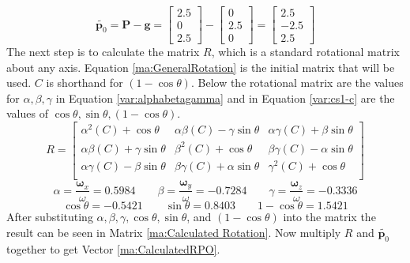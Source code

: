 \begin{equation}\label{Eq:po}
	\tilde{\mathbf{p}_{0}} = \mathbf{P} - \mathbf{g} = 
	\begin{bmatrix}
		2.5 \\
		0 	 \\
		2.5 
	\end{bmatrix} -
	\begin{bmatrix}
		0 \\
	 	2.5 	 \\
		0 
	\end{bmatrix} =
	\begin{bmatrix}
		 2.5 \\
		-2.5 	 \\
		 2.5 
	\end{bmatrix}
\end{equation}
The next step is to calculate the matrix $R$, which is a standard rotational matrix about any axis.
Equation \ref{ma:GeneralRotation} is the initial matrix that will be used. $C$ is shorthand for $(1-\cos\theta)$.
Below the rotational matrix are the values for $\alpha, \beta, \gamma$ in Equation \ref{var:alphabetagamma} and in Equation \ref{var:cs1-c} are the values of $\cos\theta, \sin\theta, (1-\cos\theta)$.
\begin{equation}\label{ma:GeneralRotation}
	R = 
	\begin{bmatrix}
		{\alpha}^{2}(C) + \cos\theta & 
		\alpha\beta(C) - \gamma\sin\theta & 
		\alpha\gamma(C) + \beta\sin\theta \\
		
		\alpha\beta(C) + \gamma\sin\theta & 
		{\beta}^{2}(C) + \cos\theta & 
		\beta\gamma(C) - \alpha\sin\theta \\
		
		\alpha\gamma(C) - \beta\sin\theta & 
		\beta\gamma(C) + \alpha\sin\theta & 
		{\gamma}^{2}(C) + \cos\theta \\
	\end{bmatrix}
\end{equation}
\begin{equation}\label{var:alphabetagamma}
	\alpha = \frac{\boldsymbol\omega_{x}}{\omega} = 0.5984
	\qquad
	\beta = \frac{\boldsymbol\omega_{y}}{\omega} = -0.7284
	\qquad
	\gamma = \frac{\boldsymbol\omega_{z}}{\omega} = -0.3336
\end{equation}
\begin{equation}\label{var:cs1-c}
	\cos\theta = -0.5421
	\qquad
	\sin\theta = 0.8403
	\qquad
	1-\cos\theta = 1.5421
\end{equation}
After substituting $\alpha, \beta, \gamma,\cos\theta, \sin\theta$, and $(1-\cos\theta)$ into the matrix the result can be seen in Matrix \ref{ma:Calculated Rotation}. Now multiply $R$ and $\tilde{\mathbf{p}_{0}}$ together to get Vector \ref{ma:CalculatedRPO}.
